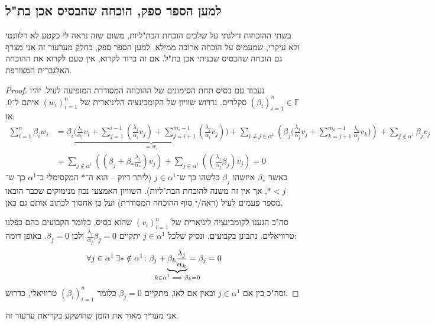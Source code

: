 \documentclass[]{article}
\newcommand\F         {\mathbb{F}}
\newcommand\co        {\colon}
\newcommand\ag        {\alpha}
\newcommand\bg        {\beta}
\renewcommand\lg      {\lambda}
\newcommand\cl [1]    {\left ( #1 \right )}
\theoremstyle{definition}
\begin{document}
	\subsection*{למען הספר ספק, הוכחה שהבסיס אכן בת"ל}
	בשתי ההוכחות דילגתי על שלבים הוכחת הבת"ליות, משום שזה נראה לי כקטע לא רלוונטי ולא עיקרי, שמעמיס על הוכחה ארוכה ממילא. למען הספר ספק, כחלק מערעור זה אני מצרף גם הוכחה שהבסיס שבניתי אכן בת"ל. אם זה ברור לקרוא, אין טעם לקרוא את ההוכחה האלגברית המצורפת. 
	\begin{proof}
		נעבוד עם בסיס תחת הסימונים של ההוכחה המסודרת המופיעה לעיל. יהיו $(\bg_i)_{i = 1}^{n} \in \F$ סקלרים. נדרוש שוויון של הקומבינציה הליניארית של $(w_i)_{i = 1}^{n}$ איתם ל־$0$. אז: 
		\begin{align*}
			\sum_{i = 1}^{n} \bg_iw_i &= \bg_i \underbrace{\Bigg (\frac{\lg_i}{\ag_i}v_i + \sum_{j = 1}^{i - 1}\cl{\frac{\lg_j}{\ag_i} v_j} + \sum_{j = i + 1}^{m_i - 1}\cl{\frac{\lg_j}{\ag_i}v_j} \Bigg )}_{= w_i}
			+ \sum_{i \neq j \in \ag^1}\cl{\bg_j \Bigg({\frac{\lg_j}{\ag_j}v_j + \sum_{k = j + 1}^{m_k - 1}\frac{\lg_k}{\ag_j}v_k}\Bigg) } + \sum_{j \notin \ag^1}\bg_j v_j \\
			&= \sum_{j \notin \ag^1}\cl{\cl{\bg_j + \bg_*\frac{\lg_j}{\ag_*}}v_j}
			+ \sum_{j \in \ag^1}\cl{\cl{\frac{\lg_j}{\ag_j}\bg_j}v_j} = 0
		\end{align*}
		כאשר $\bg_*$ איזשהו $\bg_j$ כלשהו כך ש־$j \in \ag^1$ (ליתר דיוק – הוא ה־$*$ המקסימלי ב־$\ag^1$ כך ש־$* < j$, אך אין זה משנה להוכחת הבת"ליות). השוויון האמצעי נכון מנימוקים שכבר הובאו מספר פעמים לעיל (ראה/י סוף ההוכחה המסודרת) ועל כן אחסוך לכתוב אותם גם כאן. 
			
		סה"כ הגענו לקומבינציה ליניארית של $(v_i)_{i = 1}^{n}$ שהוא בסיס, כלומר הקבועים בהם כפלנו טרוויאלים. נתבונן בקבועים, ונסיק שלכל $j \in \ag^1$ יתקיים $\frac{\lg_j}{\ag_j}\bg_j = 0$ ולכן $\bg_j = 0$. באופן דומה: 
		\[ \forall j \in \ag^1 \, \exists * \notin \ag^1 \co \bg_j + \underbrace{\bg_k\frac{\lg_j}{\ag_k}}_{\mathclap{k \in \ag^1 \implies \bg_k = 0}} = \bg_j = 0 \]
		וסה"כ בין אם $j \in \ag^1$ ובאין אם לאו, מתקיים $\bg_j = 0$ כלומר $(\bg_i)_{i = 1}^{n}$ טרוויאלי, כדרוש. 
	\end{proof}
	
	\dotfill
	
	אני מעריך מאוד את הזמן שהושקע בקריאת ערעור זה. 
	
	
\end{document}
